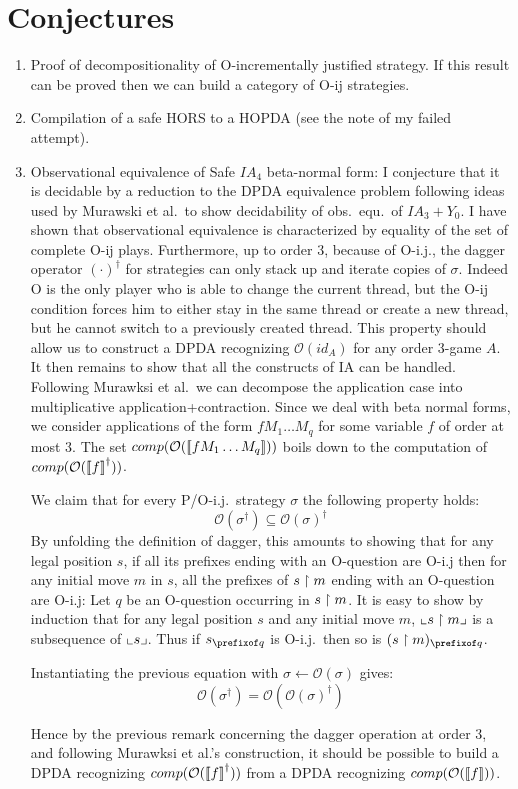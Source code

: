 \documentclass{article}
\begin{document}
\section{Conjectures}

\begin{enumerate}
  \item Proof of decompositionality of O-incrementally justified strategy. If this result can be proved then we can build a category of O-ij strategies.

  \item Compilation of a safe HORS to a HOPDA (see the note of my failed attempt).

  \item Observational equivalence of Safe $IA_4$ beta-normal form: I conjecture that it is decidable
  by a reduction to the DPDA equivalence problem following ideas used by Murawski et al.\ to show decidability of obs.\ equ.\ of $IA_3 + Y_0$.
  I have shown that observational equivalence is characterized by equality of the set of complete O-ij plays. Furthermore, up to order $3$, because of O-i.j., the dagger operator $(\cdot)^\dagger$ for strategies can only stack up and iterate copies of $\sigma$. Indeed O is the only player who is able to change the current thread, but the O-ij condition forces him to either stay in the same thread or create a new thread, but he cannot switch to a previously created thread.
  This property should allow us to construct a DPDA recognizing $\mathcal{O}(id_A)$ for any order $3$-game $A$. It then remains to show that all the constructs of IA can be handled. Following Murawksi et al.\ we can decompose the application case into multiplicative application+contraction. Since we deal with beta normal forms, we consider applications of the form $f M_1 \ldots M_q$ for some variable $f$ of order at most $3$. The set $comp(\mathcal{O}({[\![ f M_1 \ldots M_q ]\!]}))$ boils down to the computation of $comp(\mathcal{O}({[\![ f ]\!]}^\dagger))$.

  We claim that for every P/O-i.j.\ strategy $\sigma$ the following property holds:
  $$ \mathcal{O}(\sigma^\dagger) \subseteq \mathcal{O}(\sigma)^\dagger $$
  By unfolding the definition of dagger, this amounts to showing that for any legal position $s$, if all its prefixes ending with an O-question are O-i.j then for any initial move $m$ in $s$, all the prefixes of $s\upharpoonright m$ ending with an O-question are O-i.j:  Let $q$ be an O-question occurring in $s\upharpoonright m$.
  It is easy to show by induction that
  for any legal position $s$ and any initial move $m$, $\llcorner s\upharpoonright m \lrcorner$ is a subsequence of $\llcorner s \lrcorner$.
  Thus if $s_{\prefixof q}$ is O-i.j.\ then so is
  $(s\filter m)_{\prefixof q}$.

Instantiating the previous equation with $\sigma\leftarrow \mathcal{O}(\sigma)$ gives:
  $$ \mathcal{O}(\sigma^\dagger) = \mathcal{O}(\mathcal{O}(\sigma)^\dagger) $$


  Hence by the previous remark concerning the dagger operation at order $3$, and following Murawksi et al.'s construction, it should be possible to build a DPDA recognizing $comp(\mathcal{O}({[\![ f ]\!]}^\dagger))$ from a DPDA recognizing $comp(\mathcal{O}({[\![ f ]\!]}))$.


\end{enumerate}
\end{document}

